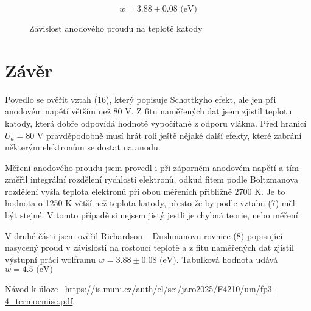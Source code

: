 \documentclass[a4paper,11pt]{article}
\begin{document}
\begin{equation*}
w = 3.88 \pm 0.08 \text{ (eV)}
\end{equation*}

\begin{figure}[h]
    \centering
    
    \caption{Závislost anodového proudu na teplotě katody }
\end{figure}

\section{Závěr}



Povedlo se ověřit vztah (16), který popisuje Schottkyho efekt, ale jen při anodovém napětí větším než 80 V. Z fitu naměřených dat jsem zjistil teplotu katody, která dobře odpovídá hodnotě vypočítané z odporu vlákna. Před hranicí $ U_a = 80 $ V pravděpodobně musí hrát roli ještě nějaké další efekty, které zabrání některým elektronům se dostat na anodu.

Měření anodového proudu jsem provedl i při záporném anodovém napětí a tím změřil integrální rozdělení rychlosti elektronů, odkud fitem podle Boltzmanova rozdělení vyšla teplota elektronů při obou měřeních přibližně $ 2700 $ K. Je to hodnota o 1250 K větší než teplota katody, přesto že by podle vztahu (7) měli být stejné. V tomto případě si nejsem jistý jestli je chybná teorie, nebo měření.

V druhé části jsem ověřil Richardson – Dushmanovu rovnice (8) popisující nasycený proud v závislosti na rostoucí teplotě a z fitu naměřených dat zjistil výstupní práci wolframu $ w = 3.88 \pm 0.08 \text{ (eV)} $. Tabulková hodnota udává $ w = 4.5  \text{ (eV)} $


\begin{thebibliography}{0}
 Návod k úloze ~\url{https://is.muni.cz/auth/el/sci/jaro2025/F4210/um/fp3-4_termoemise.pdf}.   
\end{thebibliography}
\end{document}
